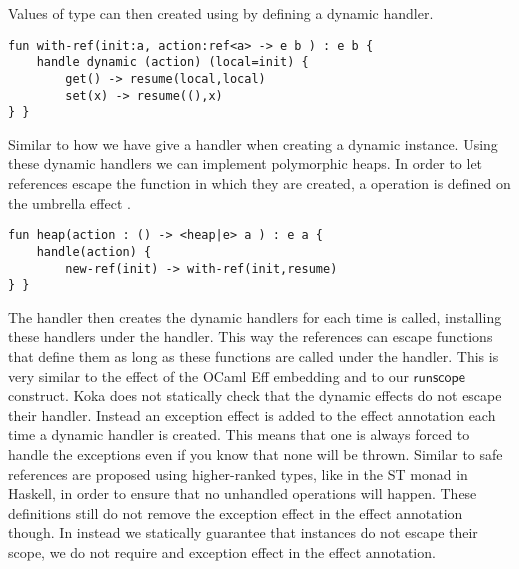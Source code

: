 \pagebreak
Values of type  can then created using by defining a dynamic handler.
\begin{verbatim}
fun with-ref(init:a, action:ref<a> -> e b ) : e b {
	handle dynamic (action) (local=init) {
		get() -> resume(local,local)
		set(x) -> resume((),x)
} }
\end{verbatim}
Similar to how we have give a handler when creating a dynamic instance.
Using these dynamic handlers we can implement polymorphic heaps.
In order to let references escape the function in which they are created, a  operation is defined on the umbrella effect .
\begin{verbatim}
fun heap(action : () -> <heap|e> a ) : e a {
	handle(action) {
		new-ref(init) -> with-ref(init,resume)
} }
\end{verbatim}
The  handler then creates the dynamic  handlers for each time  is called, installing these handlers under the  handler.
This way the references can escape functions that define them as long as these functions are called under the  handler.
This is very similar to the  effect of the OCaml Eff embedding and to our $\mathsf{runscope}$ construct.
Koka does not statically check that the dynamic effects do not escape their handler.
Instead an exception effect is added to the effect annotation each time a dynamic handler is created.
This means that one is always forced to handle the exceptions even if you know that none will be thrown.
Similar to \lang{} safe references are proposed using higher-ranked types, like in the ST monad in Haskell, in order to ensure that no unhandled operations will happen.
These definitions still do not remove the exception effect in the effect annotation though.
In \lang{} instead we statically guarantee that instances do not escape their scope, we do not require and exception effect in the effect annotation.

\iffalse
\\\\
